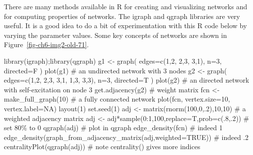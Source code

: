 \documentclass[
  a4paper,
  DIV=11,
  numbers=noendperiod,
  oneside]{scrreprt}
\newenvironment{Shaded}{\begin{snugshade}}{\end{snugshade}}
\newcommand{\AttributeTok}[1]{\textcolor[rgb]{0.40,0.45,0.13}{#1}}
\newcommand{\CommentTok}[1]{\textcolor[rgb]{0.37,0.37,0.37}{#1}}
\newcommand{\ConstantTok}[1]{\textcolor[rgb]{0.56,0.35,0.01}{#1}}
\newcommand{\DecValTok}[1]{\textcolor[rgb]{0.68,0.00,0.00}{#1}}
\newcommand{\FunctionTok}[1]{\textcolor[rgb]{0.28,0.35,0.67}{#1}}
\newcommand{\NormalTok}[1]{\textcolor[rgb]{0.00,0.23,0.31}{#1}}
\newcommand{\OtherTok}[1]{\textcolor[rgb]{0.00,0.23,0.31}{#1}}
\newcommand{\SpecialCharTok}[1]{\textcolor[rgb]{0.37,0.37,0.37}{#1}}
\begin{document}
There are many methods available in R for creating and visualizing
networks and for computing properties of networks. The igraph and qgraph
libraries are very useful. It is a good idea to do a bit of
experimentation with this R code below by varying the parameter values.
Some key concepts of networks are shown in
Figure~\ref{fig-ch6-img2-old-71}.

\begin{Shaded}
\begin{Highlighting}[]
\FunctionTok{library}\NormalTok{(igraph);}\FunctionTok{library}\NormalTok{(qgraph)}
\NormalTok{g1 }\OtherTok{\textless{}{-}} \FunctionTok{graph}\NormalTok{( }\AttributeTok{edges=}\FunctionTok{c}\NormalTok{(}\DecValTok{1}\NormalTok{,}\DecValTok{2}\NormalTok{, }\DecValTok{2}\NormalTok{,}\DecValTok{3}\NormalTok{, }\DecValTok{3}\NormalTok{,}\DecValTok{1}\NormalTok{), }\AttributeTok{n=}\DecValTok{3}\NormalTok{, }\AttributeTok{directed=}\NormalTok{F ) }
\FunctionTok{plot}\NormalTok{(g1) }\CommentTok{\# an undirected network with 3 nodes}
\NormalTok{g2 }\OtherTok{\textless{}{-}} \FunctionTok{graph}\NormalTok{( }\AttributeTok{edges=}\FunctionTok{c}\NormalTok{(}\DecValTok{1}\NormalTok{,}\DecValTok{2}\NormalTok{, }\DecValTok{2}\NormalTok{,}\DecValTok{3}\NormalTok{, }\DecValTok{3}\NormalTok{,}\DecValTok{1}\NormalTok{, }\DecValTok{1}\NormalTok{,}\DecValTok{3}\NormalTok{, }\DecValTok{3}\NormalTok{,}\DecValTok{3}\NormalTok{), }\AttributeTok{n=}\DecValTok{3}\NormalTok{, }\AttributeTok{directed=}\NormalTok{T ) }
\FunctionTok{plot}\NormalTok{(g2) }\CommentTok{\# an directed network with self{-}excitation on node 3}
\FunctionTok{get.adjacency}\NormalTok{(g2) }\CommentTok{\# weight matrix}
\NormalTok{fcn }\OtherTok{\textless{}{-}} \FunctionTok{make\_full\_graph}\NormalTok{(}\DecValTok{10}\NormalTok{) }\CommentTok{\# a fully connected network}
\FunctionTok{plot}\NormalTok{(fcn, }\AttributeTok{vertex.size=}\DecValTok{10}\NormalTok{, }\AttributeTok{vertex.label=}\ConstantTok{NA}\NormalTok{)}
\FunctionTok{layout}\NormalTok{(}\DecValTok{1}\NormalTok{)}
\FunctionTok{set.seed}\NormalTok{(}\DecValTok{1}\NormalTok{)}
\NormalTok{adj }\OtherTok{\textless{}{-}} \FunctionTok{matrix}\NormalTok{(}\FunctionTok{rnorm}\NormalTok{(}\DecValTok{100}\NormalTok{,}\DecValTok{0}\NormalTok{,.}\DecValTok{2}\NormalTok{),}\DecValTok{10}\NormalTok{,}\DecValTok{10}\NormalTok{) }\CommentTok{\# a weighted adjacency matrix}
\NormalTok{adj }\OtherTok{\textless{}{-}}\NormalTok{ adj}\SpecialCharTok{*}\FunctionTok{sample}\NormalTok{(}\DecValTok{0}\SpecialCharTok{:}\DecValTok{1}\NormalTok{,}\DecValTok{100}\NormalTok{,}\AttributeTok{replace=}\NormalTok{T,}\AttributeTok{prob=}\FunctionTok{c}\NormalTok{(.}\DecValTok{8}\NormalTok{,.}\DecValTok{2}\NormalTok{)) }\CommentTok{\# set 80\% to 0}
\FunctionTok{qgraph}\NormalTok{(adj) }\CommentTok{\# plot in qgraph}
\FunctionTok{edge\_density}\NormalTok{(fcn) }\CommentTok{\# indeed 1}
\FunctionTok{edge\_density}\NormalTok{(}\FunctionTok{graph\_from\_adjacency\_matrix}\NormalTok{(adj,}\AttributeTok{weighted=}\ConstantTok{TRUE}\NormalTok{)) }\CommentTok{\# indeed .2}
\FunctionTok{centralityPlot}\NormalTok{(}\FunctionTok{qgraph}\NormalTok{(adj)) }\CommentTok{\# note centrality() gives more indices}
\end{Highlighting}
\end{Shaded}
\end{document}
